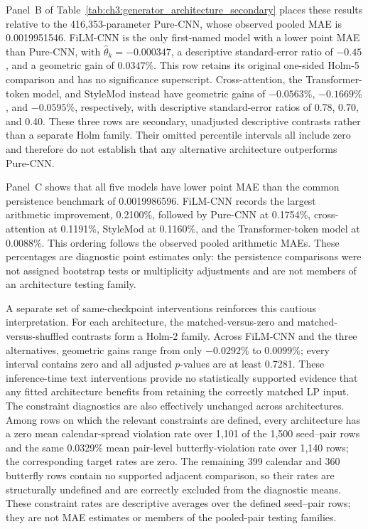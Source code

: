 Panel~B of Table~\ref{tab:ch3:generator_architecture_secondary} places these
results relative to the 416,353-parameter Pure-CNN, whose observed pooled MAE
is 0.0019951546. FiLM-CNN is the only first-named model with a lower point MAE
than Pure-CNN, with $\widehat{\theta}_k=-0.000347$, a descriptive
standard-error ratio of $-0.45$, and a geometric gain of $0.0347\%$. This row
retains its original one-sided Holm-5 comparison and has no significance
superscript. Cross-attention, the Transformer-token model, and StyleMod instead have geometric gains of
$-0.0563\%$, $-0.1669\%$, and $-0.0595\%$, respectively, with descriptive
standard-error ratios of 0.78, 0.70, and 0.40. These three rows are secondary,
unadjusted descriptive contrasts rather than a separate Holm family. Their
omitted percentile intervals all include zero and therefore do not establish
that any alternative architecture outperforms Pure-CNN.


Panel~C shows that all five models have lower point MAE than the common persistence benchmark
of 0.0019986596. FiLM-CNN records the largest arithmetic improvement,
0.2100\%, followed by Pure-CNN at 0.1754\%, cross-attention at 0.1191\%,
StyleMod at 0.1160\%, and the Transformer-token model at 0.0088\%.
This ordering follows the observed pooled arithmetic MAEs. These percentages
are diagnostic point estimates only: the persistence comparisons were not
assigned bootstrap tests or multiplicity adjustments and are not members of
an architecture testing family.


A separate set of same-checkpoint interventions reinforces this cautious
interpretation. For each architecture, the matched-versus-zero and
matched-versus-shuffled contrasts form a Holm-2 family. Across FiLM-CNN and the
three alternatives, geometric gains range from only
$-0.0292\%$ to $0.0099\%$; every interval contains zero and all adjusted
$p$-values are at least 0.7281. These inference-time text interventions provide
no statistically supported evidence that any fitted architecture benefits
from retaining the correctly matched LP input. The constraint diagnostics are
also effectively unchanged across architectures. Among rows on which the
relevant constraints are defined, every architecture has a zero mean
calendar-spread violation rate over 1,101 of the 1,500 seed--pair rows and the
same 0.0329\% mean pair-level butterfly-violation rate over 1,140 rows; the
corresponding target rates are zero. The remaining 399 calendar and 360
butterfly rows contain no supported adjacent comparison, so their rates are
structurally undefined and are correctly excluded from the diagnostic means.
These constraint rates are descriptive averages over the defined seed--pair
rows; they are not MAE estimates or members of the pooled-pair testing families.


